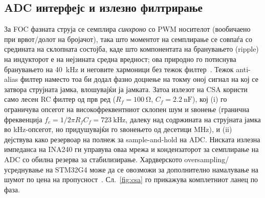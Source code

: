 \documentclass[journal,onecolumn,11pt]{IEEEtran}
\begin{document}
\subsection{ADC интерфејс и излезно филтрирање}\label{sec:csafilter}
За FOC фазната струја се семплира \emph{синхроно} со PWM носителот (вообичаено при
врвот/долот на бројачот), така што моментот на семплирање се совпаѓа со средината на
склопната состојба, каде што компонентата на бранувањето (ripple) на индукторот е на
нејзината средна вредност; ова природно го потиснува бранувањето на \SI{40}{\kilo\hertz}
и неговите хармоници без тежок филтер~\cite{an5346}. Тежок anti-alias филтер наместо
тоа би додал фазно доцнење на токму оној сигнал на кој се затвора струјната јамка,
влошувајќи ја јамката. Затоа излезот на CSA користи само лесен RC филтер од прв ред
($R_f=\SI{100}{\ohm}$, $C_f=\SI{2.2}{\nano\farad}$), кој (i) го ограничува опсегот на
високофреквентниот склопен шум и ѕвонење (гранична фреквенција
$f_c=1/2\pi R_fC_f=\SI{723}{\kilo\hertz}$, далеку над содржината на струјната јамка во
kHz-опсегот, но придушувајќи го ѕвонењето од десетици MHz), и (ii) дејствува како
резервоар на полнеж за sample-and-hold на ADC. Ниската излезна импеданса на INA240 ги
управува оваа мрежа и кондензаторот за семплирање на ADC со обилна резерва за
стабилизирање. Хардверското oversampling/усреднување на STM32G4 може да се овозможи за
дополнително намалување на шумот по цена на пропусност~\cite{an5346}.
Сл.~\ref{fig:csa} го прикажува комплетниот ланец по фаза.
\end{document}
